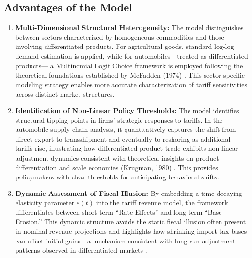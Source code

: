 \documentclass{apmcmthesis}
\begin{document}
\subsection{Advantages of the Model}
\begin{enumerate}
    \item \textbf{Multi-Dimensional Structural Heterogeneity:}
    The model distinguishes between sectors characterized by homogeneous commodities and those involving differentiated products. 
    For agricultural goods, standard log-log demand estimation is applied, while for automobiles—treated as differentiated products—
    a Multinomial Logit Choice framework is employed following the theoretical foundations established by McFadden (1974) \cite{McFadden1974}. 
    This sector-specific modeling strategy enables more accurate characterization of tariff sensitivities across distinct market structures.

    \item \textbf{Identification of Non-Linear Policy Thresholds:}
    The model identifies structural tipping points in firms’ strategic responses to tariffs. 
    In the automobile supply-chain analysis, it quantitatively captures the shift from direct export to transshipment and eventually to reshoring 
    as additional tariffs rise, illustrating how differentiated-product trade exhibits non-linear adjustment dynamics consistent with 
    theoretical insights on product differentiation and scale economies (Krugman, 1980) \cite{Krugman1980}. 
    This provides policymakers with clear thresholds for anticipating behavioral shifts.

    \item \textbf{Dynamic Assessment of Fiscal Illusion:}
    By embedding a time-decaying elasticity parameter $\varepsilon(t)$ into the tariff revenue model, 
    the framework differentiates between short-term “Rate Effects” and long-term “Base Erosion.” 
    This dynamic structure avoids the static fiscal illusion often present in nominal revenue projections 
    and highlights how shrinking import tax bases can offset initial gains—a mechanism consistent with long-run adjustment patterns 
    observed in differentiated markets \cite{Krugman1980}.
\end{enumerate}
\end{document}
